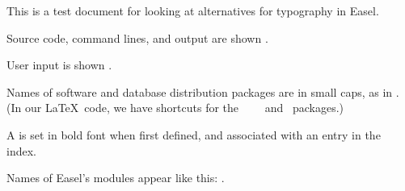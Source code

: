 \documentclass[10pt]{book}
\begin{document}
This is a test document for looking at alternatives for typography in
Easel.

Source code, command lines, and output are shown . 

User input is shown .

Names of software and database distribution packages are in small
caps, as in .  (In our \LaTeX\ code, we have shortcuts for
the \Easel\, \HMMER\, \Infernal\, \Pfam\, and \Rfam\ packages.)

A  is set in bold font when first defined, and
associated with an entry in the index.

Names of Easel's modules appear like this: .
\end{document}
